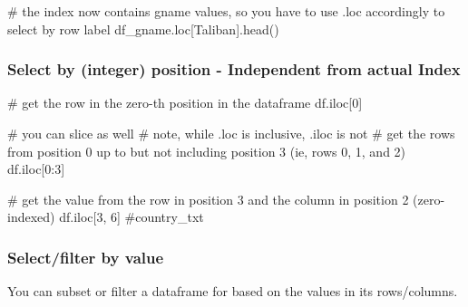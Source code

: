 \documentclass[
  letterpaper,
  DIV=11,
  numbers=noendperiod]{scrreprt}
\newenvironment{Shaded}{\begin{snugshade}}{\end{snugshade}}
\newcommand{\CommentTok}[1]{\textcolor[rgb]{0.37,0.37,0.37}{#1}}
\newcommand{\DecValTok}[1]{\textcolor[rgb]{0.68,0.00,0.00}{#1}}
\newcommand{\NormalTok}[1]{\textcolor[rgb]{0.00,0.23,0.31}{#1}}
\newcommand{\StringTok}[1]{\textcolor[rgb]{0.13,0.47,0.30}{#1}}
\begin{document}
\begin{Shaded}
\begin{Highlighting}[]
\CommentTok{\# the index now contains gname values, so you have to use .loc accordingly to select by row label}
\NormalTok{df\_gname.loc[}\StringTok{\textquotesingle{}Taliban\textquotesingle{}}\NormalTok{].head()}
\end{Highlighting}
\end{Shaded}

\subsubsection{Select by (integer) position - Independent from actual
Index}\label{select-by-integer-position---independent-from-actual-index}

\begin{Shaded}
\begin{Highlighting}[]
\CommentTok{\# get the row in the zero{-}th position in the dataframe}
\NormalTok{df.iloc[}\DecValTok{0}\NormalTok{]}
\end{Highlighting}
\end{Shaded}

\begin{Shaded}
\begin{Highlighting}[]
\CommentTok{\# you can slice as well}
\CommentTok{\# note, while .loc is inclusive, .iloc is not}
\CommentTok{\# get the rows from position 0 up to but not including position 3 (ie, rows 0, 1, and 2)}
\NormalTok{df.iloc[}\DecValTok{0}\NormalTok{:}\DecValTok{3}\NormalTok{]}
\end{Highlighting}
\end{Shaded}

\begin{Shaded}
\begin{Highlighting}[]
\CommentTok{\# get the value from the row in position 3 and the column in position 2 (zero{-}indexed)}
\NormalTok{df.iloc[}\DecValTok{3}\NormalTok{, }\DecValTok{6}\NormalTok{] }\CommentTok{\#country\_txt}
\end{Highlighting}
\end{Shaded}

\subsubsection{Select/filter by value}\label{selectfilter-by-value}

You can subset or filter a dataframe for based on the values in its
rows/columns.
\end{document}
